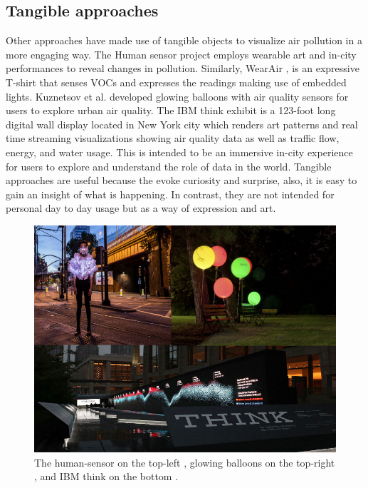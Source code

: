 \subsection{Tangible approaches}
Other approaches have made use of tangible objects to visualize air pollution in a more engaging way. The Human sensor project \cite{InvisibleDust2016} employs wearable art and in-city performances to reveal changes in pollution. Similarly, WearAir \cite{Kim2010}, is an expressive T-shirt that senses VOCs and expresses the readings making use of embedded lights. Kuznetsov et al. \cite{Kuznetsov2011} developed glowing balloons with air quality sensors for users to explore urban air quality. The IBM think exhibit \cite{IBM2012} is a 123-foot long digital wall display located in New York city which renders art patterns and real time streaming visualizations showing air quality data as well as traffic flow, energy, and water usage. This is intended to be an immersive in-city experience for users to explore and understand the role of data in the world. Tangible approaches are useful because the evoke curiosity and surprise, also, it is easy to gain an insight of what is happening. In contrast, they are not intended for personal day to day usage but as a way of expression and art. 

\begin{figure}[H]
\begin{adjustbox}{width=.8\textwidth,center=\textwidth}
  \centering
  \includegraphics[scale=.4]{images/think_human_sensor_balloons.jpg}
\end{adjustbox}
  \caption[Tangible visualizations]{The human-sensor on the top-left \cite{InvisibleDust2016}, glowing balloons on the top-right \cite{Kuznetsov2011}, and IBM think on the bottom \cite{IBM2012}.}
  \label{fig:photo_based_instaNO2}
\end{figure}

